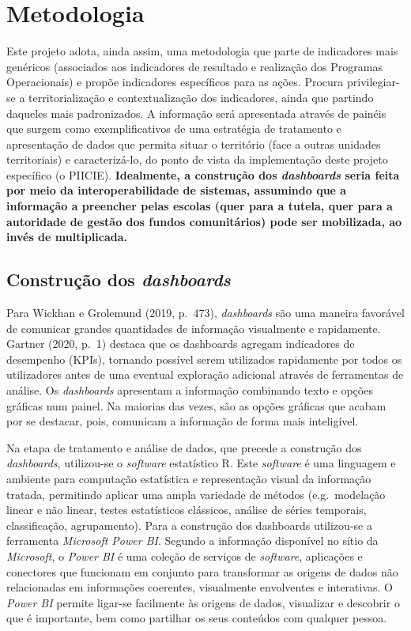 \documentclass[
]{book}
\begin{document}
\hypertarget{metodologia}{%
\section{\texorpdfstring{\textbf{Metodologia}}{Metodologia}}\label{metodologia}}

Este projeto adota, ainda assim, uma metodologia que parte de indicadores mais genéricos (associados aos indicadores de resultado e realização dos Programas Operacionais) e propõe indicadores específicos para as ações. Procura privilegiar-se a territorialização e contextualização dos indicadores, ainda que partindo daqueles mais padronizados. A informação será apresentada através de painéis que surgem como exemplificativos de uma estratégia de tratamento e apresentação de dados que permita situar o território (face a outras unidades territoriais) e caracterizá-lo, do ponto de vista da implementação deste projeto específico (o PIICIE). \textbf{Idealmente, a construção dos \emph{dashboards} seria feita por meio da interoperabilidade de sistemas, assumindo que a informação a preencher pelas escolas (quer para a tutela, quer para a autoridade de gestão dos fundos comunitários) pode ser mobilizada, ao invés de multiplicada.}

\hypertarget{construuxe7uxe3o-dos-dashboards}{%
\subsection{\texorpdfstring{\textbf{Construção dos \emph{dashboards} }}{Construção dos dashboards }}\label{construuxe7uxe3o-dos-dashboards}}

Para Wickhan e Grolemund (2019, p.~473), \emph{dashboards} são uma maneira favorável de comunicar grandes quantidades de informação visualmente e rapidamente. Gartner (2020, p.~1) destaca que os dashboards agregam indicadores de desempenho (KPIs), tornando possível serem utilizados rapidamente por todos os utilizadores antes de uma eventual exploração adicional através de ferramentas de análise. Os \emph{dashboards} apresentam a informação combinando texto e opções gráficas num painel. Na maiorias das vezes, são as opções gráficas que acabam por se destacar, pois, comunicam a informação de forma mais inteligível.

Na etapa de tratamento e análise de dados, que precede a construção dos \emph{dashboards}, utilizou-se o \emph{software} estatístico R. Este \emph{software} é uma linguagem e ambiente para computação estatística e representação visual da informação tratada, permitindo aplicar uma ampla variedade de métodos (e.g.~modelação linear e não linear, testes estatísticos clássicos, análise de séries temporais, classificação, agrupamento). Para a construção dos dashboards utilizou-se a ferramenta \emph{Microsoft Power BI}. Segundo a informação disponível no sítio da \emph{Microsoft}, o \emph{Power BI} é uma coleção de serviços de \emph{software}, aplicações e conectores que funcionam em conjunto para transformar as origens de dados não relacionadas em informações coerentes, visualmente envolventes e interativas. O \emph{Power BI} permite ligar-se facilmente às origens de dados, visualizar e descobrir o que é importante, bem como partilhar os seus conteúdos com qualquer pessoa.
\end{document}
